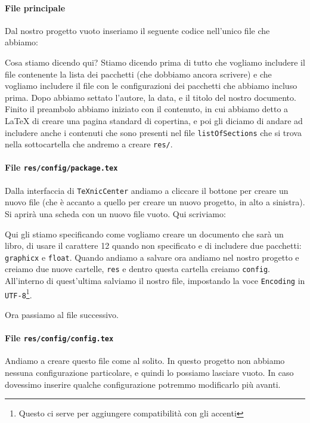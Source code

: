 \paragraph*{File principale} Dal nostro progetto vuoto inseriamo il seguente
codice nell'unico file che abbiamo:



\noindent Cosa stiamo dicendo qui? Stiamo dicendo prima di tutto che vogliamo
includere il file contenente la lista dei pacchetti (che dobbiamo ancora
scrivere) e che vogliamo includere il file con le configurazioni dei pacchetti
che abbiamo incluso prima. Dopo abbiamo settato l'autore, la data, e il titolo
del nostro documento.
Finito il preambolo abbiamo iniziato con il contenuto, in cui abbiamo detto a
\LaTeX{} di creare una pagina standard di copertina, e poi gli diciamo di
andare ad includere anche i contenuti che sono presenti nel file
\texttt{listOfSections} che si trova nella sottocartella che andremo a creare
\texttt{res/}.

\paragraph*{File \texttt{res/config/package.tex}} Dalla interfaccia di
\texttt{TeXnicCenter} andiamo a cliccare il bottone per creare un nuovo file
(che è accanto a quello per creare un nuovo progetto, in alto a sinistra). Si
aprirà una scheda con un nuovo file vuoto. Qui scriviamo:



\noindent Qui gli stiamo specificando come vogliamo creare un documento che
sarà un libro, di usare il carattere 12 quando non specificato e di includere
due pacchetti: \texttt{graphicx} e \texttt{float}.
Quando andiamo a salvare ora andiamo nel nostro progetto e creiamo due nuove
cartelle, \texttt{res} e dentro questa cartella creiamo \texttt{config}.
All'interno di quest'ultima salviamo il nostro file, impostando la voce
\texttt{Encoding} in \texttt{UTF-8}\footnote{Questo ci serve per aggiungere
compatibilità con gli accenti}.

Ora passiamo al file successivo.

\paragraph*{File \texttt{res/config/config.tex}} Andiamo a creare questo file
come al solito. In questo progetto non abbiamo nessuna configurazione
particolare, e quindi lo possiamo lasciare vuoto. In caso dovessimo inserire
qualche configurazione potremmo modificarlo più avanti.

